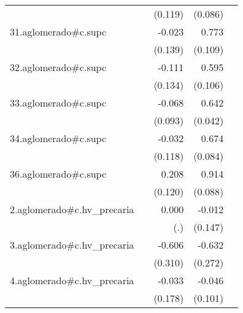 {\begin{longtable}{l*{4}{D{.}{.}{-1}}}
            &                     &     (0.119)         &     (0.086)         &                     \\
\addlinespace
31.aglomerado#c.supc&                     &      -0.023         &       0.773\sym{***}&                     \\
            &                     &     (0.139)         &     (0.109)         &                     \\
\addlinespace
32.aglomerado#c.supc&                     &      -0.111         &       0.595\sym{***}&                     \\
            &                     &     (0.134)         &     (0.106)         &                     \\
\addlinespace
33.aglomerado#c.supc&                     &      -0.068         &       0.642\sym{***}&                     \\
            &                     &     (0.093)         &     (0.042)         &                     \\
\addlinespace
34.aglomerado#c.supc&                     &      -0.032         &       0.674\sym{***}&                     \\
            &                     &     (0.118)         &     (0.084)         &                     \\
\addlinespace
36.aglomerado#c.supc&                     &       0.208         &       0.914\sym{***}&                     \\
            &                     &     (0.120)         &     (0.088)         &                     \\
\addlinespace
2.aglomerado#c.hv\_precaria&                     &       0.000         &      -0.012         &                     \\
            &                     &         (.)         &     (0.147)         &                     \\
\addlinespace
3.aglomerado#c.hv\_precaria&                     &      -0.606         &      -0.632\sym{*}  &                     \\
            &                     &     (0.310)         &     (0.272)         &                     \\
\addlinespace
4.aglomerado#c.hv\_precaria&                     &      -0.033         &      -0.046         &                     \\
            &                     &     (0.178)         &     (0.101)         &                     \\

\end{longtable}}
